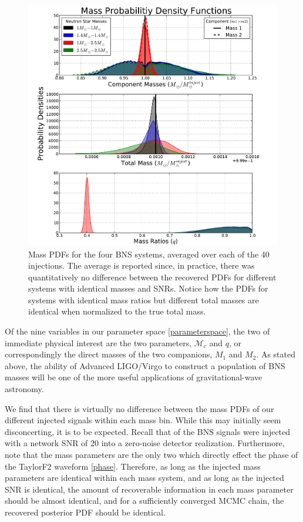 \documentclass[11pt,a4paper]{emulateapj}
\newcommand{\chmass}{\mathcal{M}_c}
\begin{document}
\begin{figure}[ht!]
  \centering
 \includegraphics[trim=2cm 0cm 2cm 0cm, clip=false,scale=0.7]{newMasses.pdf}
 \caption{Mass PDFs for the four BNS systems, averaged over each of the 40 injections.  The average is reported since, in practice, there was quantitatively no difference between the recovered PDFs for different systems with identical masses and SNRs.  Notice how the PDFs for systems with identical mass ratios but different total masses are identical when normalized to the true total mass.}
  \label{metaMassPDFs}
\end{figure}

Of the nine variables in our parameter space \eqref{parameterspace}, the two of immediate physical
interest are the two parameters, $\chmass$ and $q$, or correspondingly the direct masses 
of the two companions, $M_1$ and $M_2$.    As stated above, the ability of
Advanced LIGO/Virgo to construct a population of BNS masses will be one of the more useful applications
of gravitational-wave astronomy.

We find that there is virtually no difference between the mass PDFs of our different injected signals
within each mass bin.  While this may initially seem disconcerting, it is to be expected.  Recall that of the BNS signals were injected with a network SNR of 20 into a zero-noise detector realization.  Furthermore, note that the mass parameters are the only two which directly effect the phase of the TaylorF2 waveform \eqref{phase}.  Therefore, as long as the injected mass parameters are identical within each mass system, and as long as the injected SNR is identical, the amount of recoverable information in each mass parameter should be almost identical, and for a sufficiently converged MCMC chain, the recovered posterior PDF should be identical.  
\end{document}
